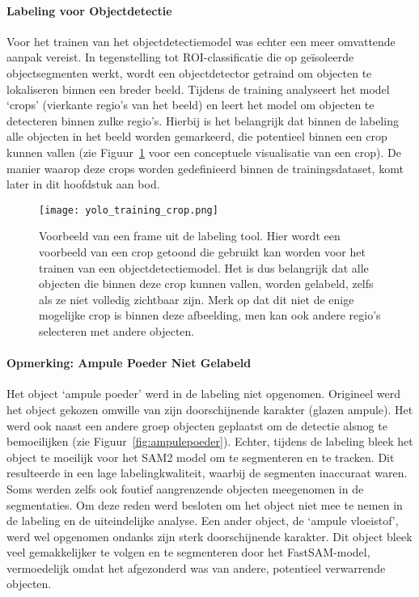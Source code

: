 \paragraph{Labeling voor Objectdetectie}
Voor het trainen van het objectdetectiemodel was echter een meer omvattende aanpak vereist.
In tegenstelling tot ROI-classificatie die op geïsoleerde objectsegmenten werkt, wordt een objectdetector 
getraind om objecten te lokaliseren binnen een breder beeld.
Tijdens de training analyseert het model `crops' (vierkante regio's van het beeld) en leert het model om objecten te detecteren binnen zulke regio's.
Hierbij is het belangrijk dat binnen de labeling alle objecten in het beeld worden gemarkeerd, die potentieel binnen een crop kunnen vallen
(zie Figuur~\ref{fig:voorbeeld_crop_yolo_training} voor een conceptuele visualisatie van een crop).
De manier waarop deze crops worden gedefinieerd binnen de trainingsdataset, komt later in dit hoofdstuk aan bod.

\begin{figure}[H]
    \centering
    \texttt{[image: yolo\_training\_crop.png]}
    \caption[Voorbeeld van een crop voor objectdetectie]{
        \label{fig:voorbeeld_crop_yolo_training}
        Voorbeeld van een frame uit de labeling tool. 
        Hier wordt een voorbeeld van een crop getoond die gebruikt kan worden voor het trainen van een objectdetectiemodel.
        Het is dus belangrijk dat alle objecten die binnen deze crop kunnen vallen,
        worden gelabeld, zelfs als ze niet volledig zichtbaar zijn.
        Merk op dat dit niet de enige mogelijke crop is binnen deze afbeelding, men kan ook andere regio's selecteren met andere objecten.
    }
\end{figure}

\paragraph{Opmerking: Ampule Poeder Niet Gelabeld}
Het object `ampule poeder' werd in de labeling niet opgenomen. 
Origineel werd het object gekozen omwille van zijn doorschijnende karakter (glazen ampule).
Het werd ook naast een andere groep objecten geplaatst om de detectie alsnog te bemoeilijken (zie Figuur~\ref{fig:ampulepoeder}).
Echter, tijdens de labeling bleek het object te moeilijk voor het SAM2 model om te segmenteren en te tracken.
Dit resulteerde in een lage labelingkwaliteit, waarbij de segmenten inaccuraat waren.
Soms werden zelfs ook foutief aangrenzende objecten meegenomen in de segmentaties.
Om deze reden werd besloten om het object niet mee te nemen in de labeling en de uiteindelijke analyse. 
Een ander object, de `ampule vloeistof', werd wel opgenomen ondanks zijn sterk doorschijnende karakter.
Dit object bleek veel gemakkelijker te volgen en te segmenteren door het FastSAM-model, vermoedelijk omdat het afgezonderd was van andere, 
potentieel verwarrende objecten.

